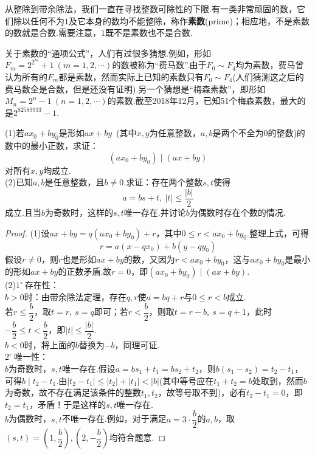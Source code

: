 \documentclass[lang=cn, zihao=5]{elegantbook}
\newcommand{\buzhou}[1]{$#1^{\circ} \ $}
\begin{document}
从整除到带余除法，我们一直在寻找整数可除性的下限.有一类非常顽固的数，它们除以任何不为$1$及它本身的数均不能整除，称作\textbf{素数}(prime)；相应地，不是素数的数就是合数.需要注意，$1$既不是素数也不是合数.

关于素数的“通项公式”，人们有过很多猜想.例如，形如$F_m=2^{2^m}+1~(m=1,2,\cdots )$的数被称为“费马数”.由于$F_0 \sim F_4$均为素数，费马曾认为所有的$F_m$都是素数，然而实际上已知的素数只有$F_0 \sim F_4$(人们猜测这之后的费马数全是合数，但是还没有证明).另一个猜想是“梅森素数”，即形如$M_n=2^n-1~(n=1,2,\cdots )$的素数.截至2018年12月，已知51个梅森素数，最大的是$2^{82589933}-1$.

\begin{example} %
	(1)若$ax_0+by_0$是形如$ax+by$~(其中$x,y$为任意整数，$a,b$是两个不全为$0$的整数)的数中的最小正数，求证：$$(ax_0+by_0) \mid (ax+by)$$对所有$x,y$均成立. \\
	(2)已知$a,b$是任意整数，且$b \neq 0$.求证：存在两个整数$s,t$使得$$a=bs+t,~|t| \leq \frac{|b|}{2}$$
	成立.且当$b$为奇数时，这样的$s,t$唯一存在.并讨论$b$为偶数时存在个数的情况.
\end{example}
\begin{proof}
	(1)设$ax+by=q(ax_0+by_0)+r$，其中$0 \leq r < ax_0+by_0$.整理上式，可得$$r=a(x-qx_0)+b(y-qy_0)$$
	假设$r \neq 0$，则$r$也是形如$ax+by$的数，又因为$r < ax_0+by_0$，这与$ax_0+by_0$是最小的形如$ax+by$的正数矛盾.故$r=0$，即$(ax_0+by_0) \mid (ax+by)$. \\
	(2)\buzhou{1}存在性： \\
	$b > 0$时：由带余除法定理，存在$q,r$使$a=bq+r$与$0 \leq r <b$成立. \\
	若$r \leq \dfrac{b}{2}$，取$t=r,~s=q$即可；若$r < \dfrac{b}{2}$，则取$t=r-b,~s=q+1$，此时$-\dfrac{b}{2} \leq t < \dfrac{b}{2}$，即$|t| \leq \dfrac{|b|}{2}$. \\
	$b < 0$时，将上面的$b$替换为$-b$，同理可证. \\
	\buzhou{2}唯一性：\\
	$b$为奇数时，$s,t$唯一存在.假设$a=bs_1+t_1=bs_2+t_2$，则$b(s_1-s_2)=t_2-t_1$，可得$b \mid t_2-t_1$.由$|t_2-t_1| \leq |t_2|+|t_1| < |b|$(其中等号应在$t_1+t_2=b$处取到，然而$b$为奇数，故不存在满足该条件的整数$t_1,t_2$，故等号取不到)，必有$t_2-t_1=0$，即$t_2=t_1$，矛盾！于是这样的$s,t$唯一存在. \\
	$b$为偶数时，$s,t$不唯一存在.例如，对于满足$a=3 \cdot \dfrac{b}{2}$的$a,b$，取$(s,t)=(1,\dfrac{b}{2}),(2,-\dfrac{b}{2})$均符合题意.
\end{proof}
\end{document}
